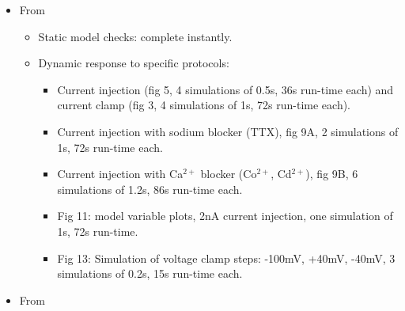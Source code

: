 \documentclass[12pt]{article}
\begin{document}
\begin{itemize}
\item From~\cite{De-Schutter-E:1994vn}

  \begin{itemize}
  \item Static model checks: complete instantly.
  \item Dynamic response to specific protocols:
    \begin{itemize}
    \item Current injection (fig 5, 4 simulations of 0.5s, 36s
      run-time each) and current clamp (fig 3, 4 simulations of 1s,
      72s run-time each).
    \item Current injection with sodium blocker (TTX), fig 9A, 2
      simulations of 1s, 72s run-time each.
    \item Current injection with Ca$^{2+}$ blocker (Co$^{2+}$,
      Cd$^{2+}$), fig 9B, 6 simulations of 1.2s, 86s run-time each.
    \item Fig 11: model variable plots, 2nA current injection, one
      simulation of 1s, 72s run-time.
    \item Fig 13: Simulation of voltage clamp steps: -100mV, +40mV,
      -40mV, 3 simulations of 0.2s, 15s run-time each.
    \end{itemize}

  \end{itemize}


\item From~\cite{E:1994hc}


\end{itemize}
\end{document}

